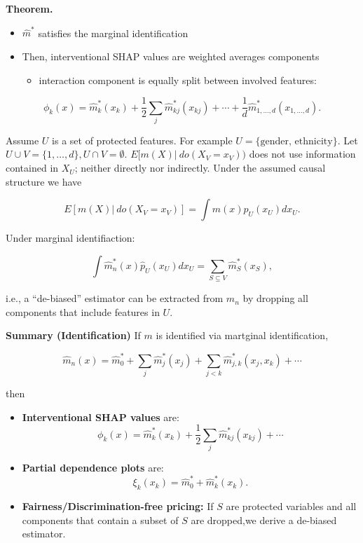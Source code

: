 \documentclass[a4paper,10pt,openany]{book}
\providecommand{\tightlist}{%
 \setlength{\itemsep}{0pt}\setlength{\parskip}{0pt}}
\begin{document}
\textbf{Theorem.}

\begin{itemize}
\tightlist
\item
  \(\hat m^{\ast}\) satisfies the marginal identification
\item
  Then, interventional SHAP values are weighted averages components

  \begin{itemize}
  \tightlist
  \item
    interaction component is equally split between involved features:
  \end{itemize}
\end{itemize}

\[
\phi_k(x)= \hat m^{\ast}_k(x_k)+ \frac 1 2 \sum_j  \hat m^{\ast}_{kj}(x_{kj}) + \cdots + \frac 1 d \hat m^{\ast}_{1,\dots,d}(x_{1,\dots,d}).
\]

Assume \(U\) is a set of protected features. For example \(U=\{\text{gender, ethnicity}\}\). Let \(U \cup V=\{1,\dots, d\}, U\cap V=\emptyset\). \(E[m(X) |\  do(X_V=x_V))\) does not use information contained in \(X_U\); neither directly nor indirectly. Under the assumed causal structure we have

\[
E[m(X) |\ do(X_V=x_V)]= \int m(x) p_U(x_U) dx_U.
\]

Under marginal identifiaction:

\[
\int \hat m_n^\ast(x) \hat p_U(x_U) dx_U= \sum_{S \subseteq V} \hat {m}^\ast_S(x_S),
\]

i.e., a ``de-biased'' estimator can be extracted from \(\hat m_n\) by dropping all components that include features in \(U\).

\textbf{Summary (Identification)} If \(m\) is identified via martginal identification,

\[
\hat m_n(x)=\hat m_0^\ast + \sum_j \hat m_j ^\ast (x_j) + \sum_{j<k} \hat m_{j,k} ^\ast (x_j,x_k)+ \cdots
\]

then

\begin{itemize}
\tightlist
\item
  \textbf{Interventional SHAP values} are:
  \[
    \phi_k(x)= \hat m^{\ast}_k(x_k)+ \frac 1 2 \sum_j  \hat m^{\ast}_{kj}(x_{kj}) + \cdots 
    \]
\item
  \textbf{Partial dependence plots} are:
  \[
    \xi_k(x_k)= \hat m_0^{\ast} + \hat m_k^\ast(x_k).
    \]
\item
  \textbf{Fairness/Discrimination-free pricing:} If \(S\) are protected variables and all components that contain a subset of \(S\) are dropped,we derive a de-biased estimator.
\end{itemize}
\end{document}
